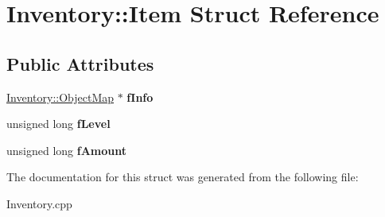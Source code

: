 \hypertarget{structInventory_1_1Item}{\section{\-Inventory\-:\-:\-Item \-Struct \-Reference}
\label{structInventory_1_1Item}
}
\subsection*{\-Public \-Attributes}
\begin{DoxyCompactItemize}
\item 
\hypertarget{structInventory_1_1Item_aef05aa18eaaac8822a08ff140b73a1e5}{\hyperlink{structInventory_1_1ObjectMap}{\-Inventory\-::\-Object\-Map} $\ast$ {\bfseries f\-Info}}\label{structInventory_1_1Item_aef05aa18eaaac8822a08ff140b73a1e5}

\item 
\hypertarget{structInventory_1_1Item_ae6bcdeff8153d27488f01cee4ee1cdc3}{unsigned long {\bfseries f\-Level}}\label{structInventory_1_1Item_ae6bcdeff8153d27488f01cee4ee1cdc3}

\item 
\hypertarget{structInventory_1_1Item_aa53e2bb9681bce6911af52af0c984ac3}{unsigned long {\bfseries f\-Amount}}\label{structInventory_1_1Item_aa53e2bb9681bce6911af52af0c984ac3}

\end{DoxyCompactItemize}


\-The documentation for this struct was generated from the following file\-:\begin{DoxyCompactItemize}
\item 
\-Inventory.\-cpp\end{DoxyCompactItemize}
